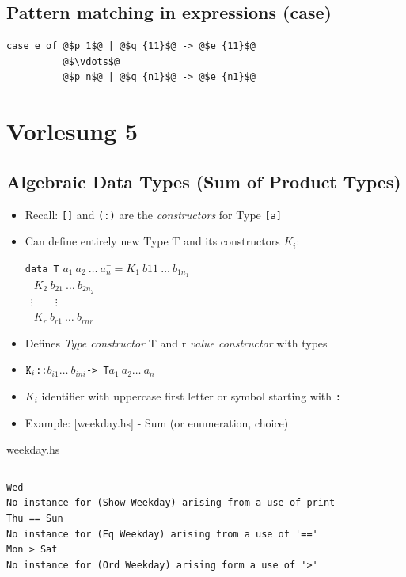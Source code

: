 \documentclass{article}
\newcommand{\Haskell}[1]{\texttt{#1}}
\begin{document}
\subsection{Pattern matching in expressions (case)}
\begin{verbatim}
case e of @$p_1$@ | @$q_{11}$@ -> @$e_{11}$@
          @$\vdots$@
          @$p_n$@ | @$q_{n1}$@ -> @$e_{n1}$@
\end{verbatim}
\clearpage
\section{Vorlesung 5}
\subsection{Algebraic Data Types (Sum of Product Types)}
\begin{itemize}
\item Recall: \Haskell{[]} and \Haskell{(:)} are the \emph{constructors} for Type \Haskell{[a]}
\item Can define entirely new Type T and its constructors $K_i$:
\subitem \begin{tabbing}
\Haskell{data T} $a_1\ a_2\ \ldots\ a_n $\=$ = K_1\ b{11}\ \ldots\ b_{1n_1}$\\
\>\  $| K_2\ b_{21}\ \ldots\ b_{2n_2}$\\
\>\  $\vdots\qquad \vdots$\\
\>\  $| K_r\ b_{r1}\ \ldots\ b_{rnr}$
\end{tabbing}
\item Defines \emph{Type constructor} T and r \emph{value constructor} with types
\item $\text{\Haskell{K}}_i$\Haskell{::}$b_{i1}\ldots\ b_{ini}$\Haskell{-> T}$a_1\ a_2\ldots\ a_n$
\item $K_i$ identifier with uppercase first letter or symbol starting with \Haskell{:}
\item Example: [weekday.hs]
\subitem - Sum (or enumeration, choice)
\end{itemize}
\begin{listing}[h!]
\caption{weekday.hs}
\inputminted{Haskell}{weekday.hs}
\end{listing}
\begin{verbatim}
Wed
No instance for (Show Weekday) arising from a use of print
Thu == Sun 
No instance for (Eq Weekday) arising from a use of '=='
Mon > Sat
No instance for (Ord Weekday) arising form a use of '>'
\end{verbatim}
\end{document}
